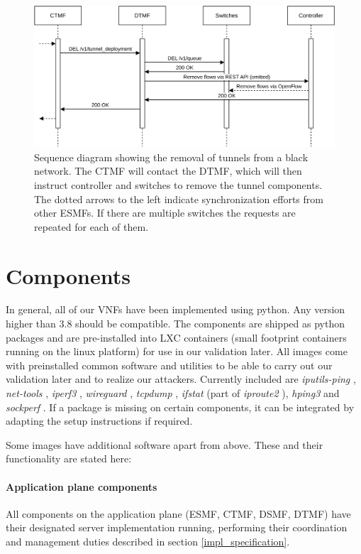 \begin{figure}[H]
  \centering
  \includegraphics[width=\linewidth]{images/chapter_6/slice_removal_bn.png}
  \caption[Slice removal from a black network]{Sequence diagram showing the removal of tunnels from a black network. The CTMF will contact the DTMF, which will then instruct controller and switches to remove the tunnel components. The dotted arrows to the left indicate synchronization efforts from other ESMFs. If there are multiple switches the requests are repeated for each of them.}
  \label{fig:slice_removal_bn}
\end{figure}

\newpage

\section{Components}
In general, all of our VNFs have been implemented using python. Any version higher than 3.8 should be compatible. The components are shipped as python packages and are pre-installed into LXC containers (small footprint containers running on the linux platform) \cite{lxc} for use in our validation later. All images come with preinstalled common software and utilities to be able to carry out our validation later and to realize our attackers. Currently included are \textit{iputils-ping} \cite{iputils}, \textit{net-tools} \cite{net-tools}, \textit{iperf3} \cite{iperf3}, \textit{wireguard} \cite{wireguard}, \textit{tcpdump} \cite{tcpdump}, \textit{ifstat} (part of \textit{iproute2} \cite{iproute2}), \textit{hping3} \cite{hping3} and \textit{sockperf} \cite{sockperf}. If a package is missing on certain components, it can be integrated by adapting the setup instructions if required.

Some images have additional software apart from above. These and their functionality are stated here:
\paragraph{Application plane components} All components on the application plane (ESMF, CTMF, DSMF, DTMF) have their designated server implementation running, performing their coordination and management duties described in section \ref{impl_specification}.
